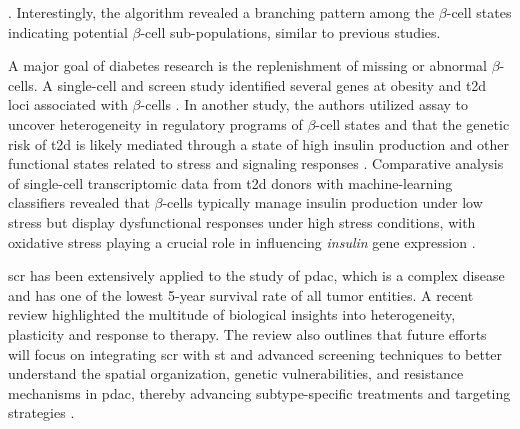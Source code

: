 \textbf{\cite{xin_pseudotime_2018}}.  Interestingly, the algorithm revealed a branching pattern among the $\beta$-cell states indicating potential $\beta$-cell sub-populations, similar to previous studies.\\
\par A major goal of diabetes research is the replenishment of missing or abnormal $\beta$-cells. A single-cell  and  screen study identified several genes at obesity and \gls{t2d} loci associated with $\beta$-cells \textbf{\cite{fang_single-cell_2019}}. %
In another study, the authors utilized  assay to uncover heterogeneity in regulatory programs of $\beta$-cell states and that the genetic risk of \gls{t2d} is likely mediated through a state of high insulin production and other functional states related to stress and signaling responses \textbf{\cite{chiou_single-cell_2021}}. %
Comparative analysis of single-cell transcriptomic data from \gls{t2d} donors with machine-learning classifiers revealed that $\beta$-cells typically manage insulin production under low stress but display dysfunctional responses under high stress conditions, with oxidative stress playing a crucial role in influencing \textit{insulin} gene expression \textbf{\cite{ma_single-cell_2018}}.\\ 
\par \gls{scr} has been extensively applied to the study of \gls{pdac}, which is a complex disease and has one of the lowest 5-year survival rate of all tumor entities. A recent review highlighted the multitude of biological insights into heterogeneity, plasticity and response to therapy. The review also outlines that future efforts will focus on integrating \gls{scr} with \gls{st} and advanced screening techniques to better understand the spatial organization, genetic vulnerabilities, and resistance mechanisms in \gls{pdac}, thereby advancing subtype-specific treatments and targeting strategies \textbf{\cite{barthel_single-cell_2023}}.
